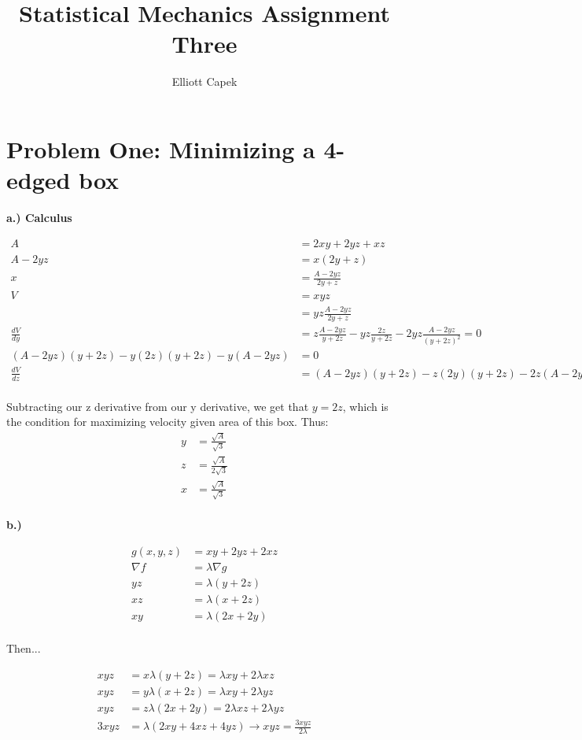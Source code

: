 \documentclass[10pt]{article} %
\title{Statistical Mechanics Assignment Three}
\author{Elliott Capek}
\begin{document}
\maketitle{}

\section{Problem One: Minimizing a 4-edged box}
\textbf{a.) Calculus}

\begin{align*}
  A &= 2xy + 2yz + xz\\
  A - 2yz &= x(2y + z)\\
  x &= \frac{A-2yz}{2y+z}\\
  V &= xyz\\
  &= yz\frac{A-2yz}{2y+z}\\
  \frac{dV}{dy} &= z\frac{A-2yz}{y+2z} - yz\frac{2z}{y+2z}
  - 2yz\frac{A-2yz}{(y+2z)^2} = 0\\
  (A-2yz)(y+2z) - y(2z)(y+2z) - y(A-2yz) &= 0\\
  \frac{dV}{dz} &= (A - 2yz)(y+2z) - z(2y)(y+2z) - 2z(A-2yz) = 0\\
\end{align*}

Subtracting our z derivative from our y derivative, we get that $y = 2z$, which
is the condition for maximizing velocity given area of this box. Thus:\\

\begin{align*}
  y &= \frac{\sqrt{A}}{\sqrt{3}}\\
  z &= \frac{\sqrt{A}}{2\sqrt{3}}\\
  x &= \frac{\sqrt{A}}{\sqrt{3}}\\
\end{align*}

\textbf{b.)}

\begin{align*}
  g(x,y,z) &= xy + 2yz + 2xz\\
  \nabla f &= \lambda \nabla g\\
  yz &= \lambda(y+2z)\\
  xz &= \lambda(x+2z)\\
  xy &= \lambda(2x+2y)\\
\end{align*}

Then...

\begin{align*}
  xyz &= x\lambda(y+2z) = \lambda xy + 2\lambda xz\\
  xyz &= y\lambda(x+2z)= \lambda xy + 2\lambda yz\\
  xyz &= z\lambda(2x+2y) = 2\lambda xz + 2\lambda yz\\
  3xyz &= \lambda(2xy + 4xz + 4yz) \rightarrow xyz = \frac{3xyz}{2\lambda}\\
\end{align*}
\end{document}
